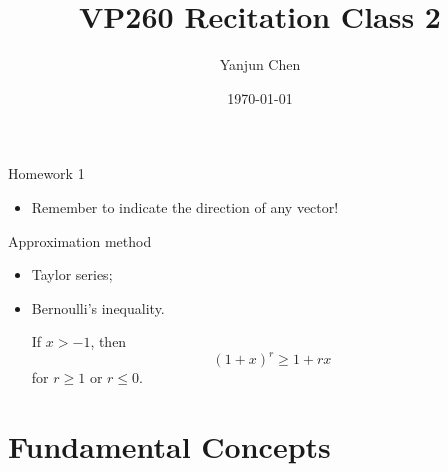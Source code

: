 \documentclass{beamer}
\title[VP260 RC]{VP260 Recitation Class 2} %
\author{Yanjun Chen} %
\institute[UM-SJTU JI] %
{
    University of Michigan - Shanghai Jiao Tong University Joint Institute\\%
\medskip
}
\date{\today} %
\begin{document}
\begin{frame}
    \titlepage %
\end{frame}


\begin{frame}{Homework 1}
    \begin{itemize}
        \item Remember to indicate the direction of any vector!
    \end{itemize}

    \begin{block}{Approximation method}
        \begin{itemize}
            \item Taylor series;
            \item Bernoulli's inequality.
            
            If $x > -1$, then
            \begin{equation}
                (1 + x)^r \geq 1 + rx
            \end{equation}
            for $r \geq 1$ or $r \leq 0$.
        \end{itemize}
    \end{block}

\end{frame}


\section{Fundamental Concepts} %

\end{document}
